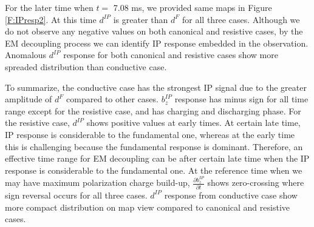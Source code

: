 \documentclass[a4paper, 11pt]{article}
\newcommand{\dip}{d^{IP}}
\begin{document}
For the later time when $t=$ 7.08 ms, we provided same maps in Figure \ref{F:IPresp2}. At this time $\dip$ is greater than $d^{F}$ for all three cases. Although we do not observe any negative values on both canonical and resistive cases, by the EM decoupling process we can identify IP response embedded in the observation. Anomalous $\dip$ response for both canonical and resistive cases show more spreaded distribution than conductive case. 

To summarize, the conductive case has the strongest IP signal due to the greater amplitude of $d^{F}$ compared to other cases. $b^{IP}_z$ response has minus sign for all time range except for the resistive case, and has charging and discharging phase. For the resistive case, $\dip$ shows positive values at early times. At certain late time, IP response is considerable to the fundamental one, whereas at the early time this is challenging because the fundamental response is dominant. Therefore, an effective time range for EM decoupling can be after certain late time when the IP response is considerable to the fundamental one. At the reference time when we may have maximum polarization charge build-up, $\frac{\partial b^{IP}_z}{\partial t}$ shows zero-crossing where sign reversal occurs for all three cases. $\dip$ response from conductive case show more compact distribution on map view compared to canonical and resistive cases. 
\end{document}
